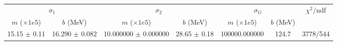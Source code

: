 \begin{tabular}{cc|cc|cc||c}
\multicolumn{2}{c|}{$\sigma_1$} & \multicolumn{2}{|c}{$\sigma_2$} & \multicolumn{2}{|c}{$\sigma_G$}  & \multirow{2}{*}{$\chi^2/$ndf}\\
$m$ ($\times1e5$) & $b$ (MeV) & $m$ ($\times1e5$) & $b$ (MeV) & $m$ ($\times1e5$) & $b$ (MeV) & \\
\hline
15.15 $\pm$ 0.11 & 16.290 $\pm$ 0.082 & 10.000000 $\pm$ 0.000000 & 28.65 $\pm$ 0.18 & 100000.000000 & 124.7 & 3778/544\\
\end{tabular}
